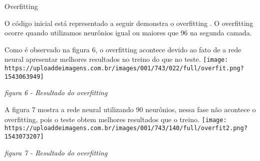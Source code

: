 \documentclass[11pt]{article}
\makeatletter
\def\maxwidth{\ifdim\Gin@nat@width>\linewidth\linewidth
    \else\Gin@nat@width\fi}
\let\Oldincludegraphics\includegraphics
\renewcommand{\includegraphics}[1]{\Oldincludegraphics[width=.8\maxwidth]{#1}}
\makeatother
\begin{document}
    Overfitting

O código inicial está representado a seguir demonstra o overfitting . O
overfitting ocorre quando utilizamos neurônios igual ou maiores que 96
na segunda camada.

Como é observado na figura 6, o overfitting acontece devido ao fato de a
rede neural apresentar melhores resultados no treino do que no teste.
\texttt{[image: https://uploaddeimagens.com.br/images/001/743/022/full/overfit.png?1543063949]}

\emph{figura 6 - Resultado do overfitting}

A figura 7 mostra a rede neural utilizando 90 neurônios, nessa fase não
acontece o overfitting, pois o teste obtem melhores resultados que o
treino.
\texttt{[image: https://uploaddeimagens.com.br/images/001/743/140/full/overfit2.png?1543073207]}

\emph{figura 7 - Resultado do overfitting}
\end{document}
